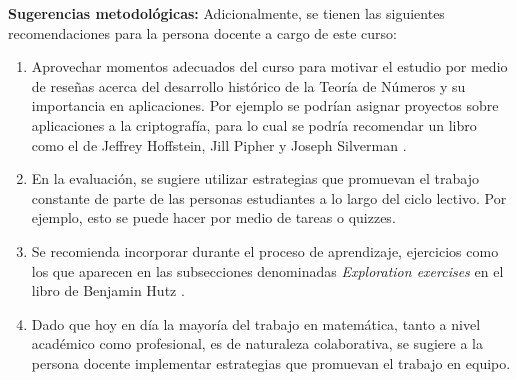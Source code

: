 \begin{refsection}
\textbf{Sugerencias metodológicas:} Adicionalmente, se tienen las siguientes recomendaciones para la persona docente a cargo de este curso:
\begin{enumerate}
    \item Aprovechar momentos adecuados del curso para motivar el estudio por medio de reseñas acerca del desarrollo histórico de la Teoría de Números y su importancia en aplicaciones. Por ejemplo se podrían asignar proyectos sobre aplicaciones a la criptografía, para lo cual se podría recomendar un libro como el de Jeffrey Hoffstein, Jill Pipher y Joseph Silverman \cite{HPS14}.
    \item En la evaluación, se sugiere utilizar estrategias que promuevan el trabajo constante de parte de las personas estudiantes a lo largo del ciclo lectivo. Por ejemplo, esto se puede hacer por medio de tareas o quizzes.
    \item Se recomienda incorporar durante el proceso de aprendizaje, ejercicios como los que aparecen en las subsecciones denominadas \textit{Exploration exercises} en el libro de Benjamin Hutz \cite{Hut18}.
    \item Dado que hoy en día la mayoría del trabajo en matemática, tanto a nivel académico como profesional, es de naturaleza colaborativa, se sugiere a la persona docente implementar estrategias que promuevan el trabajo en equipo.
\end{enumerate}



\nocite{And94}
\nocite{Apo76}
\nocite{Hut18}
\nocite{LZ19}
\nocite{Fla18}
\nocite{Ore88}
\nocite{Bak12}
\nocite{Dav08}
\nocite{Sta78}
\nocite{Sti03}
\nocite{LeV90}
\nocite{LeV02}
\nocite{NZM91}
\nocite{Pen23}




\printbibliography[heading=subbibliography]
\end{refsection}

